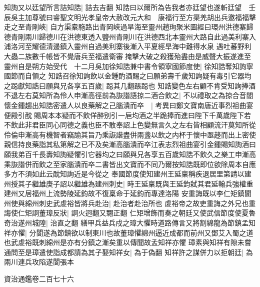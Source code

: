 知詢又以廷望所言詰知誥|{
	詰去吉翻}
知誥曰以爾所為告我者亦廷望也遂斬廷望　壬辰吳主加尊號曰睿聖文明光孝皇帝大赦改元大和　康福行至方渠羌胡出兵邀福福擊走之至青剛峽|{
	自方渠槖駞路出青岡峽過旱海至靈州趙珣聚米圖經曰環州洪德寨歸德青剛兩川歸德川在洪德東透入鹽州青剛川在洪德西北本靈州大路自此過美利寨入浦洛河至耀德清邊鎮入靈州自過美利寨後漸入平夏經旱海中難得水泉}
遇吐蕃野利大蟲二族數千帳皆不覺唐兵至福遣衛審掩擊大破之殺獲殆盡由是威聲大振遂進至靈州自是朔方始受代　十二月吳加徐知誥兼中書令領寧國節度使|{
	徐知誥奪知詢寧國節而自領之}
知誥召徐知詢飲以金鍾酌酒賜之曰願弟壽千歲知詢疑有毒引它器均之跽獻知誥曰願與兄各享五百歲|{
	跽其几翻䠆跽也}
知誥變色左右顧不肯受知詢捧酒不退左右莫知所為伶人申漸高徑前為詼諧語掠二酒合飲之|{
	不以禮取之為掠合音閤}
懷金鍾趨出知誥密遣人以良藥解之己腦潰而卒　|{
	考異曰鄭文寶南唐近事烈祖曲宴便殿引酖賜周本本疑而不飲佯醉别引一巵均酒之半跪捧而進曰陛下千萬歲陛下若不飲此非君臣同心同德之義也臣不敢奉詔上色變無言久之左右皆相顧流汗莫知所從伶倫申漸高有機智者竊諭其旨乃乘詼諧盡併兩盞以飲之内杯于懷中亟趍而出上密使親信持良藥詣其私第解之已不及矣漸高腦潰而卒江表志烈祖曲宴引金鍾賜知詢酒曰願我弟百千長壽知詢疑懼引它器均之曰願與兄各享五百歲知誥不飲久之樂工申漸高乘詼諧併而飲之至家腦潰而卒二書皆出文寶而不同乃爾按知誥既即位欲除周本自應多方不須如此云酖知詢近是今從之}
奉國節度使知建州王延稟稱疾退居里第請以建州授其子繼雄庚子詔以繼雄為建州刺史|{
	時王延稟既與王延鈞弑其君延翰兵強權重建州又居福州上流勢陵延鈞故不復稟命于延鈞而專達洛陽}
安重誨既以李仁矩鎮閬州使與綿州刺史武䖍裕皆將兵赴治|{
	赴治者赴治所也}
䖍裕帝之故吏重誨之外兄也重誨使仁矩詗董璋反狀|{
	詗火迥翻又翾正翻}
仁矩增飾而奏之朝廷又使武信節度使夏魯奇治遂州城隍|{
	治直之翻}
繕甲兵益兵戍之璋大懼時道路傳言又將割綿龍為節鎮孟知祥亦懼|{
	分閬遂為節鎮欲以制東川也故董璋懼綿州逼近成都而前州又鄧艾入蜀之道也武䖍裕既刺綿州是亦有分鎮之漸矣重以傳聞故孟知祥亦懼}
璋素與知祥有隙未嘗通問至是璋遣使詣成都請為其子娶知祥女|{
	為于偽翻}
知祥許之謀併力以拒朝廷|{
	為兩川連兵攻陷遂閬張本}


資治通鑑卷二百七十六
